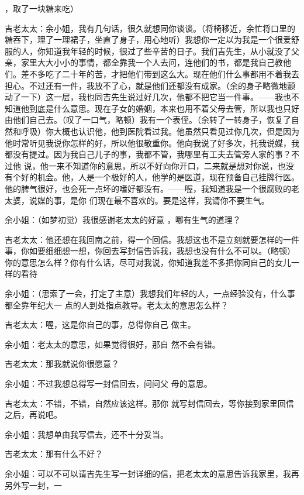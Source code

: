 \documentclass{article}
\begin{document}
，取了一块糖来吃） 

吉老太太：余小姐，我有几句话，很久就想同你谈谈。（将椅移近，余忙将口里的糖吞下，理了一理裙子，坐直了身子，用心地听）我想你一定以为我是一个很爱舒服的人，你知道我年轻的时候，很过了些辛苦的日子。我们吉先生，从小就没了父亲，家里大大小小的事情，都全靠我一个人去问，连他们的书，都是我自己教他们。差不多吃了二十年的苦，才把他们带到这么大。现在他们什么事都用不着我去担心。不过还有一件，我放不了心，就是他们还都没有成家。（余的身子略微地颤动了一下）这一层，我也同吉先生说过好几次，他都不把它当一件事。——我也不知道他到底是什么意思。现在子女的婚姻，本来也用不着父母去管，所以我也只好由他们自己去。（叹了一口气，略顿）我有一个表侄。（余转了一转身子，恢复了自然和呼吸）你大概也认识他，他到医院看过我。他虽然只看见过你几次，但是因为他时常听见我说你怎样的好，所以他很敬重你。他向我说了好多次，托我说媒，我都没有提过。因为我自己儿子的事，我都不管，我哪里有工夫去管旁人家的事？不过他
\newpage
说，他一来不知道你的意思，所以不好向你开口，二来就是想对你说，也没有个好的机会。他，人是一个极好的人，他学的是医道，现在预备自己挂牌行医。他的脾气很好，也会死一点坏的嗜好都没有。——喔，我知道我是一个很腐败的老太婆，说媒的事，是你
们现在最不喜欢的。要是这样，我请你不要生气。 


余小姐：（如梦初觉）我很感谢老太太的好意
，哪有生气的道理？ 

吉老太太：他还想在我回南之前，得一个回信。我想这也不是立刻就要怎样的一件事，你如要细细想一想，你回去写封信告诉我，我想也没有什么不可以。（略顿）你的意思怎么样？你有什么话，尽可对我说，你知道我差不多把你同自己的女儿一样的看待

余小姐：（思索了一会，打定了主意）我想我们年轻的人，一点经验没有，什么事都全靠年纪大一
点的人到处指点教导。老太太的意思怎么样？ 

\newpage

吉老太太：喔，这是你自己的事，总得你自己
做主。 

余小姐：老太太的意思，如果觉得很好，那自
然不会有错。 


吉老太太：那我就说你很愿意？ 

余小姐：不过我想总得写一封信回去，问问父
母的意思。 

吉老太太：不错，不错，自然应该这样。那你
就写封信回去，等你接到家里回信之后，再说吧。 

余小姐：我想单由我写信去，还不十分妥当。


吉老太太：那有什么不好？ 

余小姐：可以不可以请吉先生写一封详细的信，把老太太的意思告诉我家里，我再另外写一封，一
\end{document}
